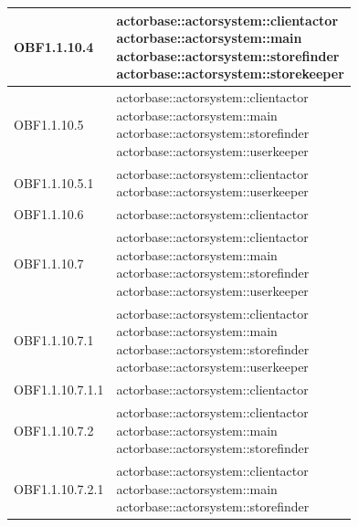 \documentclass{scalatekids-article}
\begin{document}
\begin{longtable}[H]{|p{3.5cm}|p{7.5cm}|}
\hline
OBF1.1.10.4 & \multiLineCell[t]{actorbase::actorsystem::clientactor\\actorbase::actorsystem::main\\actorbase::actorsystem::storefinder\\actorbase::actorsystem::storekeeper\\}\\
\hline
OBF1.1.10.5 & \multiLineCell[t]{actorbase::actorsystem::clientactor\\actorbase::actorsystem::main\\actorbase::actorsystem::storefinder\\actorbase::actorsystem::userkeeper\\}\\
\hline
OBF1.1.10.5.1 & \multiLineCell[t]{actorbase::actorsystem::clientactor\\actorbase::actorsystem::userkeeper\\}\\
\hline
OBF1.1.10.6 & \multiLineCell[t]{actorbase::actorsystem::clientactor\\}\\
\hline
OBF1.1.10.7 & \multiLineCell[t]{actorbase::actorsystem::clientactor\\actorbase::actorsystem::main\\actorbase::actorsystem::storefinder\\actorbase::actorsystem::userkeeper\\}\\
\hline
OBF1.1.10.7.1 & \multiLineCell[t]{actorbase::actorsystem::clientactor\\actorbase::actorsystem::main\\actorbase::actorsystem::storefinder\\actorbase::actorsystem::userkeeper\\}\\
\hline
OBF1.1.10.7.1.1 & \multiLineCell[t]{actorbase::actorsystem::clientactor\\}\\
\hline
OBF1.1.10.7.2 & \multiLineCell[t]{actorbase::actorsystem::clientactor\\actorbase::actorsystem::main\\actorbase::actorsystem::storefinder\\}\\
\hline
OBF1.1.10.7.2.1 & \multiLineCell[t]{actorbase::actorsystem::clientactor\\actorbase::actorsystem::main\\actorbase::actorsystem::storefinder\\}\\

\end{longtable}
\end{document}
